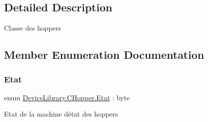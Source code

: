 \subsection{Detailed Description}
Classe des hoppers 



\subsection{Member Enumeration Documentation}
\mbox{\label{class_device_library_1_1_c_hopper_a5f54d84c3b2a93420c8ff69b1351c77a}} 
\subsubsection{\texorpdfstring{Etat}{Etat}}
{\footnotesize\ttfamily enum \mbox{\hyperlink{class_device_library_1_1_c_hopper_a5f54d84c3b2a93420c8ff69b1351c77a}{Device\+Library.\+C\+Hopper.\+Etat}} \+: byte\hspace{0.3cm}{\ttfamily [strong]}}



Etat de la machine d\textquotesingle{}état des hoppers 

